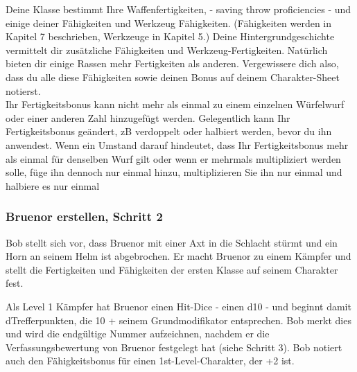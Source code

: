 Deine Klasse bestimmt Ihre Waffenfertigkeiten, - saving throw proficiencies -
 und einige deiner Fähigkeiten und Werkzeug Fähigkeiten. (Fähigkeiten werden in Kapitel 7 beschrieben, Werkzeuge in Kapitel 5.) Deine Hintergrundgeschichte vermittelt dir zusätzliche Fähigkeiten und Werkzeug-Fertigkeiten. Natürlich bieten dir einige Rassen mehr Fertigkeiten als anderen. Vergewissere dich also, dass du alle diese Fähigkeiten sowie deinen  Bonus auf deinem Charakter-Sheet notierst.\\
Ihr Fertigkeitsbonus kann nicht mehr als einmal zu einem einzelnen Würfelwurf oder einer anderen Zahl hinzugefügt werden. Gelegentlich kann Ihr Fertigkeitsbonus geändert, zB verdoppelt oder halbiert werden, bevor du ihn anwendest. Wenn ein Umstand darauf hindeutet, dass Ihr Fertigkeitsbonus mehr als einmal für denselben Wurf gilt oder wenn er mehrmals multipliziert werden solle, füge ihn dennoch nur einmal hinzu, multiplizieren Sie ihn nur einmal und halbiere es nur einmal
\subsubsection{Bruenor erstellen, Schritt 2}
Bob stellt sich vor, dass Bruenor mit einer Axt in die Schlacht stürmt und ein Horn an seinem Helm ist abgebrochen. Er macht Bruenor zu einem Kämpfer und stellt die Fertigkeiten und Fähigkeiten der ersten Klasse auf seinem Charakter fest.

Als Level 1 Kämpfer hat Bruenor einen Hit-Dice - einen d10 - und beginnt damit dTrefferpunkten, die 10 + seinem Grundmodifikator entsprechen. Bob merkt dies und wird die endgültige Nummer aufzeichnen, nachdem er die Verfassungsbewertung von Bruenor festgelegt hat (siehe Schritt 3). Bob notiert auch den Fähigkeitsbonus für einen 1st-Level-Charakter, der +2 ist.


